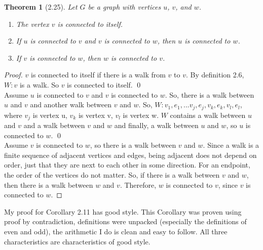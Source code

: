\documentclass{article}
\newtheorem*{thm}{Theorem}
\begin{document}
\begin{description}
		\begin{thm}[2.25]
		          Let $G$ be a graph with vertices $u$, $v$, and $w$.
        	  \begin{enumerate}
        	    \item The vertex $v$ is connected to itself.
       		    \item If $u$ is connected to $v$ and $v$ is connected to $w$, then $u$ is connected to $w$.
        	    \item If $v$ is connected to $w$, then $w$ is connected to $v$.
         	 \end{enumerate}
 		 \end{thm}
 		  \begin{proof}
        		$v$ is connected to itself if there is a walk from $v$ to $v$. By definition 2.6, $W: v$ is a walk. So $v$ is connected to itself. \qed
         		 \\
         		Assume $u$ is connected to $v$ and $v$ is connected to $w$. So, there is a walk between $u$ and $v$ and another walk between $v$ and $w$. 
			So, $W: v_1, e_1, ... v_j, e_j, v_k, e_k, v_l, e_l$, where $v_j$     is vertex u, 
			$v_k$ is vertex v, $v_l$ is vertex w. $W$ contains a walk between $u$ and $v$ and a 
			walk between $v$ and $w$ and finally, a walk between $u    $ and $w$,  so $u$ is connected to $w$. \qed
         		 \\
         		Assume $v$ is connected to $w$, so there is a walk between $v$ and $w$. 
			Since a walk is a finite sequence of adjacent vertices and edges, being adjacent does not depend on order, 
			just that they are next to each other in some direction. For an endpoint, the order of the vertices do not matter.
			So, if there is a walk between $v$ and $w$, then there is a walk between $w$ and $v$. Therefore, $w$ is connected to $v$, 
			since $v$ is connected to $w$.
 		\end{proof}
	
		My proof for Corollary 2.11 has good style. This Corollary was proven using proof by contradiction, definitions were unpacked
		(especially the definitions of even and odd), the arithmetic I do is clean and easy to follow. All three characteristics are 
		characteristics of good style.
	

\end{description}
\end{document}
